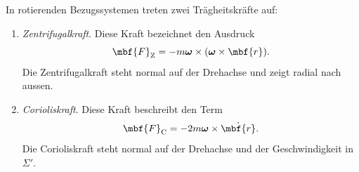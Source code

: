 In rotierenden Bezugssystemen treten zwei Trägheitskräfte auf:
\begin{enumerate}
  \item \emph{Zentrifugalkraft}. Diese Kraft bezeichnet den Ausdruck
  \begin{equation}
    \mbf{F}_{\text{Z}} = - m\boldsymbol{\omega}\times (\boldsymbol{\omega}\times \mbf{r}).
  \end{equation}
  Die Zentrifugalkraft steht normal auf der Drehachse und zeigt radial nach aussen.
  \item \emph{Corioliskraft}. Diese Kraft beschreibt den Term
  \begin{equation}
    \mbf{F}_{\text{C}} = -2m\boldsymbol{\omega}\times \dot{\mbf{r}}.
  \end{equation}
  Die Corioliskraft steht normal auf der Drehachse und der Geschwindigkeit in $\Sigma'$.
\end{enumerate}
